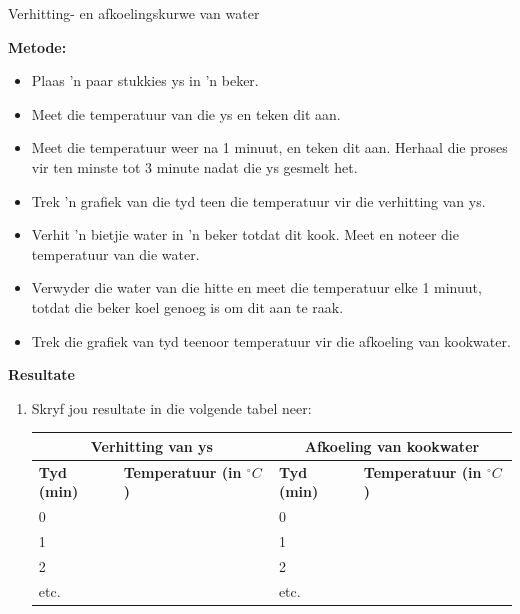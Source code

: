 \begin{f_experiment}{Verhitting- en afkoelingskurwe van water}
{\label{m38736*eip-862}\noindent{}\textbf{Metode:}
\label{m38736*id9872}\begin{itemize}[noitemsep]
            \item Plaas  'n paar stukkies ys in  'n beker.
\item Meet die temperatuur van die ys en teken dit aan.
\item Meet die temperatuur weer na 1 minuut, en teken dit aan. Herhaal die proses vir ten minste tot 3 minute nadat die ys gesmelt het.
\item Trek  'n grafiek van die tyd teen die temperatuur vir die verhitting van ys. 
\item Verhit  'n bietjie water in  'n beker totdat dit kook. Meet en noteer die temperatuur van die water.
\item Verwyder die water van die hitte en meet die temperatuur elke 1 minuut, totdat die beker koel genoeg is om dit aan te raak.
\item Trek die grafiek van tyd teenoor temperatuur vir die afkoeling van kookwater. 
\end{itemize}
\label{m38736*eip-282}
	\par 
      \label{m38736*eip-863}\noindent{}\textbf{Resultate} \\
\begin{enumerate}[noitemsep, label=\textbf{\arabic*}.]
\item Skryf jou resultate in die volgende tabel neer: \\
          \begin{table}[H]
        \begin{center}
      \label{m38736*uid434}
    \noindent
      \begin{tabular}{|l|l|l|l|}\hline
\multicolumn{2}{|c|}{Verhitting van ys} & \multicolumn{2}{|c|}{Afkoeling van kookwater}  \\ \hline
 \textbf{Tyd (min)} & \textbf{Temperatuur (in $^{\circ} C$)} &  \textbf{Tyd (min)} & \textbf{Temperatuur (in $^{\circ} C$)} \\ \hline
     0    & & 0    & \\ \hline 
     1    & & 1    & \\ \hline
     2    & & 2    & \\ \hline
     etc. & & etc. & \\ \hline

\end{tabular}
\end{center}
\end{table}
\end{enumerate}}
\end{f_experiment}
